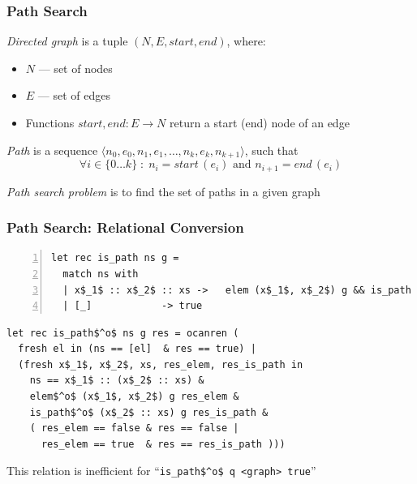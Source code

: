 \documentclass[xcolor=table]{beamer}
\begin{document}
\begin{frame}[fragile]
  \transwipe[direction=90]
  \frametitle{Path Search}

\emph{Directed graph} is a tuple $(N, E, start, end)$, where:

\begin{itemize}
	\item $N$ --- set of nodes
	\item $E$ --- set of edges
	\item Functions $start, end: E \rightarrow N$ return a start (end) node of an edge
\end{itemize}

\pause
\vspace{10pt}

\emph{Path} is a sequence $\langle n_0, e_0, n_1, e_1, \dots, n_k, e_k, n_{k+1} \rangle$, such that
\[
\forall i \in \{ 0 \dots k \}\; :\; n_i = start\,(e_i) \text{ and } n_{i+1} = end\,(e_i)
\]

\vspace{10pt}

\pause
\emph{Path search problem} is to find the set of paths in a given graph

\end{frame}

\begin{frame}[fragile]
  \transwipe[direction=90]
  \frametitle{Path Search: Relational Conversion }

\begin{lstlisting}[numbers=left,numberstyle=\small]
let rec is_path ns g =
  match ns with
  | x$_1$ :: x$_2$ :: xs ->   elem (x$_1$, x$_2$) g && is_path (x$_2$ :: xs) g
  | [_]            -> true
\end{lstlisting}

\pause

\begin{lstlisting}[]
let rec is_path$^o$ ns g res = ocanren (
  fresh el in (ns == [el]  & res == true) |
  (fresh x$_1$, x$_2$, xs, res_elem, res_is_path in
    ns == x$_1$ :: (x$_2$ :: xs) &
    elem$^o$ (x$_1$, x$_2$) g res_elem &
    is_path$^o$ (x$_2$ :: xs) g res_is_path &
    ( res_elem == false & res == false |
      res_elem == true  & res == res_is_path )))
\end{lstlisting}

This relation is inefficient for ``\lstinline{is_path$^o$ q <graph> true}''

\end{frame}
\end{document}
